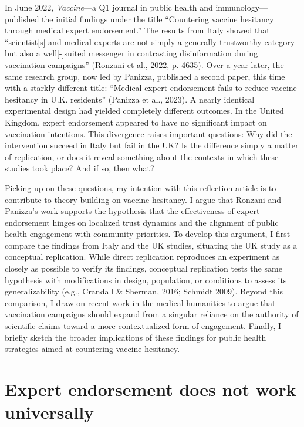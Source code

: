 \documentclass[authordate, reflection]{jote-new-article}
\begin{document}
	In June 2022, \emph{Vaccine}—a Q1 journal in public health and immunology—published the initial findings under the title “Countering vaccine hesitancy through medical expert endorsement.” The results from Italy showed that “scientist[s] and medical experts are not simply a generally trustworthy category but also a well[-]suited messenger in contrasting disinformation during vaccination campaigns” (Ronzani et al., 2022, p. 4635). Over a year later, the same research group, now led by Panizza, published a second paper, this time with a starkly different title: “Medical expert endorsement fails to reduce vaccine hesitancy in U.K. residents” (Panizza et al., 2023). A nearly identical experimental design had yielded completely different outcomes. In the United Kingdom, expert endorsement appeared to have no significant impact on vaccination intentions. This divergence raises important questions: Why did the intervention succeed in Italy but fail in the UK? Is the difference simply a matter of replication, or does it reveal something about the contexts in which these studies took place? And if so, then what?







	Picking up on these questions, my intention with this reflection article is to contribute to theory building on vaccine hesitancy. I argue that Ronzani and Panizza's work supports the hypothesis that the effectiveness of expert endorsement hinges on localized trust dynamics and the alignment of public health engagement with community priorities. To develop this argument, I first compare the findings from Italy and the UK studies, situating the UK study as a conceptual replication. While direct replication reproduces an experiment as closely as possible to verify its findings, conceptual replication tests the same hypothesis with modifications in design, population, or conditions to assess its generalizability (e.g., Crandall \& Sherman, 2016; Schmidt 2009). Beyond this comparison, I draw on recent work in the medical humanities to argue that vaccination campaigns should expand from a singular reliance on the authority of scientific claims toward a more contextualized form of engagement. Finally, I briefly sketch the broader implications of these findings for public health strategies aimed at countering vaccine hesitancy.







	\section{Expert endorsement does not work universally}
\end{document}
